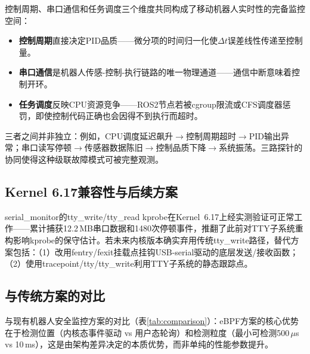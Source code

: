 \documentclass{rjthesis}
\begin{document}
控制周期、串口通信和任务调度三个维度共同构成了移动机器人实时性的完备监控空间：

\begin{itemize}
    \item \textbf{控制周期}直接决定PID品质\cite{brown2012}——微分项的时间归一化使$\Delta t$误差线性传递至控制量。
    \item \textbf{串口通信}是机器人传感-控制-执行链路的唯一物理通道——通信中断意味着控制开环。
    \item \textbf{任务调度}反映CPU资源竞争——ROS2节点若被cgroup限流或CFS调度器惩罚\cite{sharaf2022}，即使控制代码正确也会因得不到执行而超时。
\end{itemize}

三者之间并非独立：例如，CPU调度延迟飙升$\to$控制周期超时$\to$PID输出异常；串口读写停顿$\to$传感器数据陈旧$\to$控制品质下降$\to$系统振荡。三路探针的协同使得这种级联故障模式可被完整观测。

\subsection{Kernel 6.17兼容性与后续方案}

serial\_monitor的tty\_write/tty\_read kprobe在Kernel~6.17上经实测验证可正常工作——累计捕获12.2\,MB串口数据和1480次停顿事件，推翻了此前对TTY子系统重构影响kprobe的保守估计。若未来内核版本确实弃用传统tty\_write路径，替代方案包括：（1）改用fentry/fexit挂载点挂钩USB-serial驱动的底层发送/接收函数；（2）使用tracepoint/tty/tty\_write利用TTY子系统的静态跟踪点。

\subsection{与传统方案的对比}

与现有机器人安全监控方案的对比（表\ref{tab:comparison}）：eBPF方案的核心优势在于检测位置（内核态事件驱动 vs 用户态轮询）和检测粒度（最小可检测500\,$\mu$s vs 10\,ms），这是由架构差异决定的本质优势，而非单纯的性能参数提升。
\end{document}
